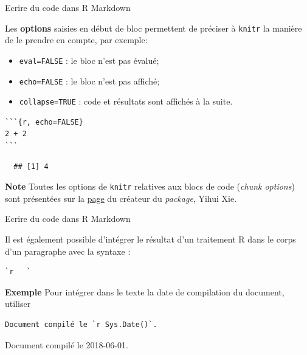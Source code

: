 \documentclass[12pt,ignorenonframetext,handout,]{beamer}
\providecommand{\tightlist}{%
  \setlength{\itemsep}{0pt}\setlength{\parskip}{0pt}}
\newcommand{\intertitre}[1]{\textcolor{redInsee}{\textbf{#1}}}
\begin{document}
\begin{frame}[fragile]{Ecrire du code dans R Markdown}
\protect\hypertarget{ecrire-du-code-dans-r-markdown-1}{}

Les \textbf{options} saisies en début de bloc permettent de préciser à
\texttt{knitr} la manière de le prendre en compte, par exemple:

\begin{itemize}
\tightlist
\item
  \texttt{eval=FALSE} : le bloc n’est pas évalué;
\item
  \texttt{echo=FALSE} : le bloc n’est pas affiché;
\item
  \texttt{collapse=TRUE} : code et résultats sont affichés à la suite.
\end{itemize}

\pause

\begin{verbatim}
```{r, echo=FALSE}
2 + 2
```
\end{verbatim}

\begin{verbatim}
  ## [1] 4
\end{verbatim}

\pause

\intertitre{Note} Toutes les options de \texttt{knitr} relatives aux
blocs de code (\emph{chunk options}) sont présentées sur la
\href{http://yihui.name/knitr/options/}{\underline{page}} du créateur du
\emph{package}, Yihui Xie.

\end{frame}

\begin{frame}[fragile]{Ecrire du code dans R Markdown}
\protect\hypertarget{ecrire-du-code-dans-r-markdown-2}{}

Il est également possible d’intégrer le résultat d’un traitement R dans
le corps d’un paragraphe avec la syntaxe :

\begin{verbatim}
`r   `
\end{verbatim}

\pause

\intertitre{Exemple} Pour intégrer dans le texte la date de compilation
du document, utiliser

\begin{verbatim}
Document compilé le `r Sys.Date()`.
\end{verbatim}

\pause Document compilé le 2018-06-01.

\end{frame}
\end{document}
